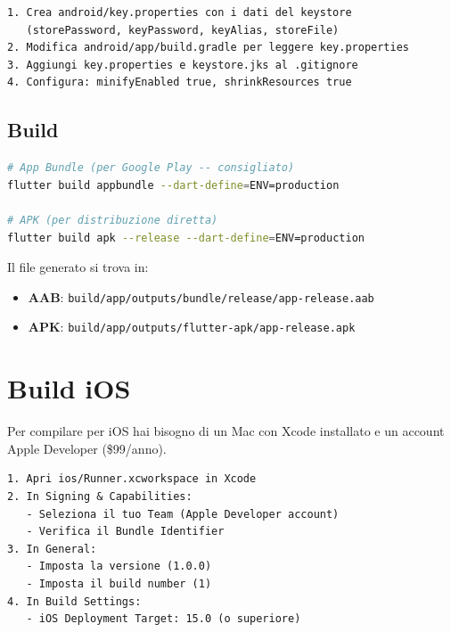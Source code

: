 \begin{praticabox}[title={Pratica --- Configura la firma}]
\begin{lstlisting}[language={}]
1. Crea android/key.properties con i dati del keystore
   (storePassword, keyPassword, keyAlias, storeFile)
2. Modifica android/app/build.gradle per leggere key.properties
3. Aggiungi key.properties e keystore.jks al .gitignore
4. Configura: minifyEnabled true, shrinkResources true
\end{lstlisting}
\end{praticabox}

\subsection{Build}

\begin{lstlisting}[language=bash]
# App Bundle (per Google Play -- consigliato)
flutter build appbundle --dart-define=ENV=production

# APK (per distribuzione diretta)
flutter build apk --release --dart-define=ENV=production
\end{lstlisting}

Il file generato si trova in:
\begin{itemize}
  \item \textbf{AAB}: \texttt{build/app/outputs/bundle/release/app-release.aab}
  \item \textbf{APK}: \texttt{build/app/outputs/flutter-apk/app-release.apk}
\end{itemize}

\section{Build iOS}

\begin{warnbox}
Per compilare per iOS hai bisogno di un Mac con Xcode installato e un account Apple Developer (\$99/anno).
\end{warnbox}

\begin{praticabox}[title={Pratica --- Configurazione Xcode}]
\begin{lstlisting}[language={}]
1. Apri ios/Runner.xcworkspace in Xcode
2. In Signing & Capabilities:
   - Seleziona il tuo Team (Apple Developer account)
   - Verifica il Bundle Identifier
3. In General:
   - Imposta la versione (1.0.0)
   - Imposta il build number (1)
4. In Build Settings:
   - iOS Deployment Target: 15.0 (o superiore)
\end{lstlisting}
\end{praticabox}

